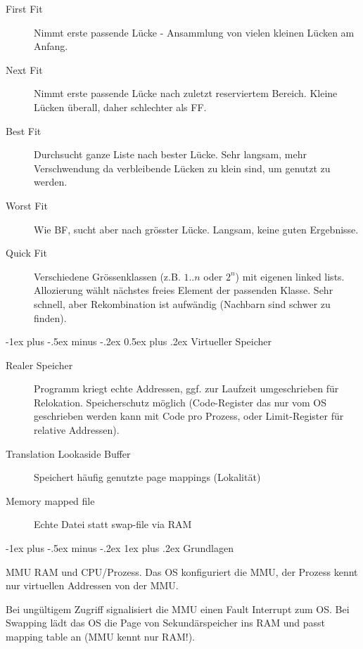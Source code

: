 \documentclass[10pt,landscape,a4paper]{article}
\makeatletter
\renewcommand{\section}{\@startsection{section}{1}{0mm}%
                                {-1ex plus -.5ex minus -.2ex}%
                                {0.5ex plus .2ex}%
                                {\normalfont\large\bfseries}}
\renewcommand{\subsubsection}{\@startsection{subsubsection}{3}{0mm}%
                                {-1ex plus -.5ex minus -.2ex}%
                                {1ex plus .2ex}%
                                {\normalfont\footnotesize\bfseries}}
\makeatother
\begin{document}
\begin{multicols*}{3}
\begin{description}
  \item[First Fit] Nimmt erste passende Lücke - Ansammlung von vielen
    kleinen Lücken am Anfang.
  \item[Next Fit] Nimmt erste passende Lücke nach zuletzt reserviertem Bereich.
    Kleine Lücken überall, daher schlechter als FF.
  \item[Best Fit] Durchsucht ganze Liste nach bester Lücke. Sehr langsam, mehr
    Verschwendung da verbleibende Lücken zu klein sind, um genutzt zu werden.
  \item[Worst Fit] Wie BF, sucht aber nach grösster Lücke. Langsam, keine guten Ergebnisse.
  \item[Quick Fit] Verschiedene Grössenklassen (z.B. $1..n$ oder $2^n$) mit
    eigenen linked lists. Allozierung wählt nächstes freies Element der
    passenden Klasse. Sehr schnell, aber Rekombination ist aufwändig (Nachbarn
    sind schwer zu finden).
\end{description}

\section{Virtueller Speicher}

\begin{description}
  \item[Realer Speicher] Programm kriegt echte Addressen, ggf. zur Laufzeit
    umgeschrieben für Relokation. Speicherschutz möglich (Code-Register das nur
    vom OS geschrieben werden kann mit Code pro Prozess, oder Limit-Register für
    relative Addressen).
  \item[Translation Lookaside Buffer] Speichert häufig genutzte page mappings (Lokalität)
  \item[Memory mapped file] Echte Datei statt swap-file via RAM
\end{description}

\subsubsection{Grundlagen}

MMU RAM und CPU/Prozess. Das OS konfiguriert
die MMU, der Prozess kennt nur virtuellen Addressen von der MMU.

Bei ungültigem Zugriff signalisiert die MMU einen Fault Interrupt zum OS.
Bei Swapping lädt das OS die Page von Sekundärspeicher ins RAM und
passt mapping table an (MMU kennt nur RAM!).


\end{multicols*}
\end{document}
